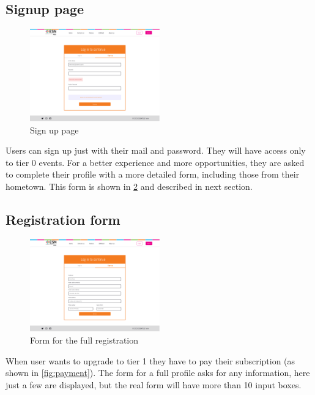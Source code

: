 \subsection{Signup page}
\begin{figure}[H]
    \centering
    \includegraphics[width=0.5\textwidth]{images/signup.png}
    \caption{Sign up page}
    \label{fig:signup page}
\end{figure}
Users can sign up just with their mail and password. They will have access only to tier
0 events. For a better experience and more opportunities,
they are asked to complete their profile with a more detailed form, including those from
their hometown. This form is shown in \ref{fig:form} and described in next section.
\subsection{Registration form}
\begin{figure}[H]
    \centering
    \includegraphics[width=0.5\textwidth]{images/form.png}
    \caption{Form for the full registration}
    \label{fig:form}
\end{figure}
When user wants to upgrade to tier 1 they have to pay their subscription (as shown in \ref{fig:payment}).
The form for a full profile asks for any information, here just a few are displayed, but the 
real form will have more than 10 input boxes. 
